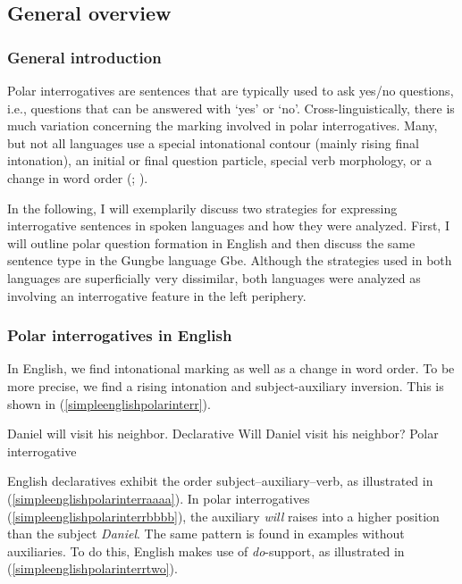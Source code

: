 \subsection{General overview}\label{generalpolar}

\subsubsection{General introduction}
Polar interrogatives are sentences that are typically used to ask yes/no questions, i.e., questions that can be answered with `yes' or `no'. Cross-linguistically, there is much variation concerning the marking involved in polar interrogatives. Many, but not all languages use a special intonational contour (mainly rising final intonation), an initial or final question particle, special verb morphology, or a change in word order (\citealt[181--182]{sadock1985speech}; \citealt{dryer2013questions}).

In the following, I will exemplarily discuss two strategies for expressing interrogative sentences in spoken languages and how they were analyzed. First, I will outline polar question formation in English and then discuss the same sentence type in the Gungbe language Gbe. Although the strategies used in both languages are superficially very dissimilar, both languages were analyzed as involving an interrogative feature in the left periphery.

\subsubsection{Polar interrogatives in English}

In English, we find intonational marking as well as a change in word order. To be more precise, we find a rising intonation and subject-auxiliary inversion. This is shown in (\ref{simpleenglishpolarinterr}).

\begin{exe}
\ex\label{simpleenglishpolarinterr}\begin{xlist}
\ex Daniel will visit his neighbor. \hfill Declarative\label{simpleenglishpolarinterraaaa}
\ex Will Daniel visit his neighbor? \hfill Polar interrogative\label{simpleenglishpolarinterrbbbb}
\end{xlist}
\end{exe}

\noindent English declaratives exhibit the order subject--auxiliary--verb, as illustrated in (\ref{simpleenglishpolarinterraaaa}). In polar interrogatives (\ref{simpleenglishpolarinterrbbbb}), the auxiliary \textit{will} raises into a higher position than the subject \textit{Daniel}. The same pattern is found in examples without auxiliaries. To do this, English makes use of \textit{do}-support, as illustrated in (\ref{simpleenglishpolarinterrtwo}).

